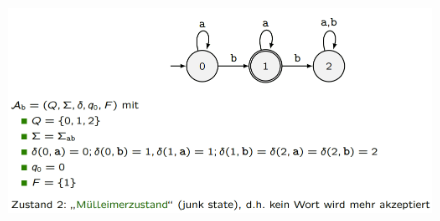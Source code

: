 \documentclass[12pt,a4paper]{article}
\begin{document}
\begin{center}
	\begin{figure}[!h]
		\includegraphics[width=\textwidth]{Bilder/DEA_Beispiel.PNG}
	\end{figure}
\end{center}
\end{document}
